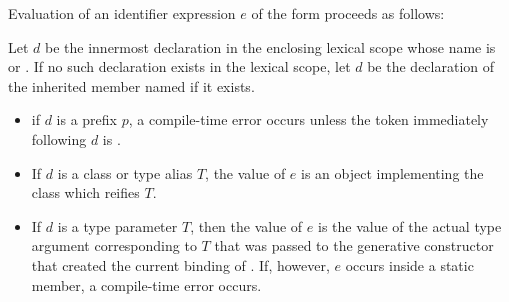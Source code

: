 \documentclass[makeidx]{article}
\begin{document}

\LMHash{}%
Evaluation of an identifier expression $e$ of the form \id{} proceeds as follows:

\LMHash{}%
Let $d$ be the innermost declaration in the enclosing lexical scope whose name is \id{} or \code{\id=}.
If no such declaration exists in the lexical scope, let $d$ be the declaration of the inherited member named \id{} if it exists.

\begin{itemize}
\item if $d$ is a prefix $p$, a compile-time error occurs unless the token immediately following $d$ is .
\item If $d$ is a class or type alias $T$, the value of $e$ is an object implementing the class  which reifies $T$.
\item If $d$ is a type parameter $T$, then the value of $e$ is the value of the actual type argument corresponding to $T$ that was passed to the generative constructor that created the current binding of \THIS{}.
If, however, $e$ occurs inside a static member, a compile-time error occurs.


\end{itemize}
\end{document}
